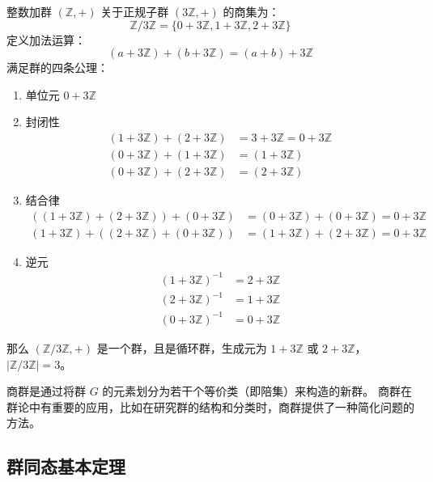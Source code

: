 \begin{example}
    整数加群 $(\mathbb{Z}, +)$ 关于正规子群 $(3\mathbb{Z}, +)$ 的商集为：
    \[
        \mathbb{Z}/3\mathbb{Z} = \{0+3\mathbb{Z}, 1+3\mathbb{Z}, 2+3\mathbb{Z}\}
    \]
    定义加法运算：
    \[
        (a+3\mathbb{Z}) + (b+3\mathbb{Z}) = (a+b)+3\mathbb{Z}
    \]
    满足群的四条公理：
    \begin{enumerate}
        \item 单位元 $0+3\mathbb{Z}$
        \item 封闭性
        \begin{align*}
            (1+3\mathbb{Z}) +(2+3\mathbb{Z}) &= 3+3\mathbb{Z} = 0 +3\mathbb{Z}\\
            (0+3\mathbb{Z})+( 1+3\mathbb{Z}) &= ( 1+3\mathbb{Z}) \\
            (0+3\mathbb{Z})+( 2+3\mathbb{Z}) &= ( 2+3\mathbb{Z})
        \end{align*}
        \item 结合律
        \begin{align*}
            ((1+3\mathbb{Z}) +(2+3\mathbb{Z})) +(0+3\mathbb{Z}) &= (0+3\mathbb{Z}) +(0+3\mathbb{Z}) = 0+3\mathbb{Z}\\
            (1+3\mathbb{Z}) +((2+3\mathbb{Z}) +(0+3\mathbb{Z})) &= (1+3\mathbb{Z}) +(2+3\mathbb{Z}) = 0+3\mathbb{Z}
        \end{align*}
        \item 逆元
        \begin{align*}
            (1+3\mathbb{Z})^{-1} &= 2+3\mathbb{Z}\\
            (2+3\mathbb{Z})^{-1} &= 1+3\mathbb{Z}\\
            (0+3\mathbb{Z})^{-1} &= 0+3\mathbb{Z}
        \end{align*}
    \end{enumerate}
    那么 $(\mathbb{Z}/3\mathbb{Z}, +)$ 是一个群，且是循环群，生成元为 $1+3\mathbb{Z}$ 或 $2+3\mathbb{Z}$，$|\mathbb{Z}/3\mathbb{Z}| = 3$。
\end{example}

\begin{note}
    商群是通过将群 $G$ 的元素划分为若干个等价类（即陪集）来构造的新群。
    商群在群论中有重要的应用，比如在研究群的结构和分类时，商群提供了一种简化问题的方法。
\end{note}

\vspace{1em}
\subsection{群同态基本定理}

